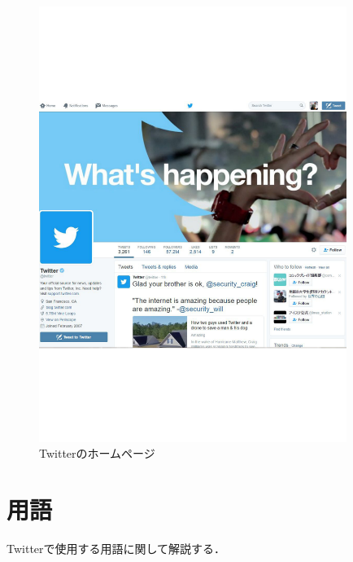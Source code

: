 	\begin{figure}[h]
		\centering
		\includegraphics[width=10cm]{twi.pdf}
		\caption{Twitterのホームページ}\label{ace}
	\end{figure}


\clearpage
\section{用語}
Twitterで使用する用語に関して解説する．

